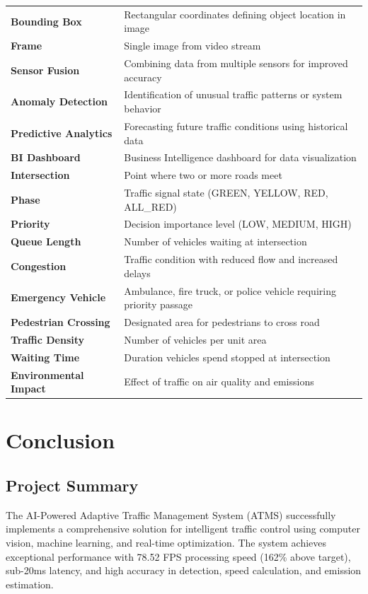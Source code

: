 \documentclass[12pt,a4paper]{article}
\begin{document}
\begin{longtable}{|p{4cm}|p{10cm}|}
\textbf{Bounding Box} & Rectangular coordinates defining object location in image \\
\textbf{Frame} & Single image from video stream \\
\textbf{Sensor Fusion} & Combining data from multiple sensors for improved accuracy \\
\textbf{Anomaly Detection} & Identification of unusual traffic patterns or system behavior \\
\textbf{Predictive Analytics} & Forecasting future traffic conditions using historical data \\
\textbf{BI Dashboard} & Business Intelligence dashboard for data visualization \\
\textbf{Intersection} & Point where two or more roads meet \\
\textbf{Phase} & Traffic signal state (GREEN, YELLOW, RED, ALL\_RED) \\
\textbf{Priority} & Decision importance level (LOW, MEDIUM, HIGH) \\
\textbf{Queue Length} & Number of vehicles waiting at intersection \\
\textbf{Congestion} & Traffic condition with reduced flow and increased delays \\
\textbf{Emergency Vehicle} & Ambulance, fire truck, or police vehicle requiring priority passage \\
\textbf{Pedestrian Crossing} & Designated area for pedestrians to cross road \\
\textbf{Traffic Density} & Number of vehicles per unit area \\
\textbf{Waiting Time} & Duration vehicles spend stopped at intersection \\
\textbf{Environmental Impact} & Effect of traffic on air quality and emissions \\
\hline
\end{longtable}

\section{Conclusion}

\subsection{Project Summary}
The AI-Powered Adaptive Traffic Management System (ATMS) successfully implements a comprehensive solution for intelligent traffic control using computer vision, machine learning, and real-time optimization. The system achieves exceptional performance with 78.52 FPS processing speed (162\% above target), sub-20ms latency, and high accuracy in detection, speed calculation, and emission estimation.
\end{document}
